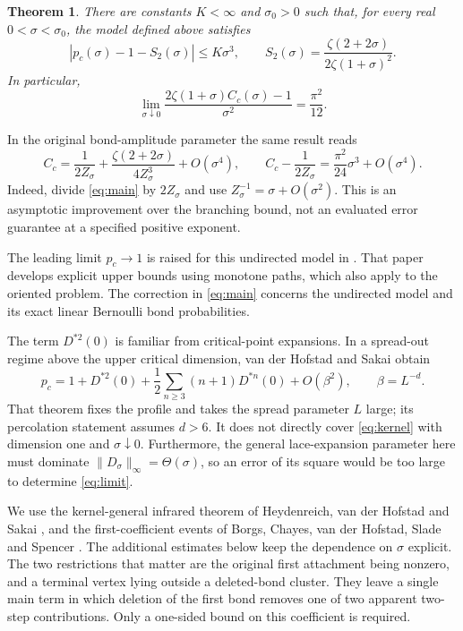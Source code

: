 \documentclass[11pt]{article}
\newtheorem{theorem}{Theorem}[section]
\theoremstyle{definition}
\begin{document}
\begin{theorem}\label{thm:main}
There are constants $K<\infty$ and $\sigma_0>0$ such that, for every real
$0<\sigma<\sigma_0$, the model defined above satisfies
\begin{equation}\label{eq:main}
 \left|p_c(\sigma)-1-S_2(\sigma)\right|\le K\sigma^3,
 \qquad
 S_2(\sigma)=\frac{\zeta(2+2\sigma)}{2\zeta(1+\sigma)^2}.
\end{equation}
In particular,
\begin{equation}\label{eq:limit}
 \lim_{\sigma\downarrow0}
 \frac{2\zeta(1+\sigma)C_c(\sigma)-1}{\sigma^2}
 =\frac{\pi^2}{12}.
\end{equation}
\end{theorem}

In the original bond-amplitude parameter the same result reads
\begin{equation}\label{eq:amplitude}
 C_c=\frac{1}{2Z_\sigma}
       +\frac{\zeta(2+2\sigma)}{4Z_\sigma^3}+O(\sigma^4),
 \qquad
 C_c-\frac{1}{2Z_\sigma}
       =\frac{\pi^2}{24}\sigma^3+O(\sigma^4).
\end{equation}
Indeed, divide \eqref{eq:main} by $2Z_\sigma$ and use
$Z_\sigma^{-1}=\sigma+O(\sigma^2)$. This is an asymptotic improvement
over the branching bound, not an evaluated error guarantee at a specified
positive exponent.

The leading limit $p_c\to1$ is raised for this undirected model in
\cite[Section~7]{Amit2026}. That paper develops explicit upper bounds using
monotone paths, which also apply to the oriented problem. The correction in
\eqref{eq:main} concerns the undirected model and its exact linear Bernoulli
bond probabilities.

The term $D^{*2}(0)$ is familiar from critical-point expansions. In a
spread-out regime above the upper critical dimension, van der Hofstad and
Sakai \cite[Theorem~1.1, (1.14)]{HS2005} obtain
\[
 p_c=1+D^{*2}(0)+\frac12\sum_{n\ge3}(n+1)D^{*n}(0)+O(\beta^2),
 \qquad \beta=L^{-d}.
\]
That theorem fixes the profile and takes the spread parameter $L$ large;
its percolation statement assumes $d>6$. It does not directly cover
\eqref{eq:kernel} with dimension one and $\sigma\downarrow0$. Furthermore,
the general lace-expansion parameter here must dominate
$\|D_\sigma\|_\infty=\Theta(\sigma)$, so an error of its square would be
too large to determine \eqref{eq:limit}.

We use the kernel-general infrared theorem of Heydenreich, van der Hofstad
and Sakai \cite{HHS2008}, and the first-coefficient events of
Borgs, Chayes, van der Hofstad, Slade and Spencer \cite{BCHSS2005}.
The additional estimates below keep the dependence on $\sigma$ explicit.
The two restrictions that matter are the original first attachment being
nonzero, and a terminal vertex lying outside a deleted-bond cluster. They
leave a single main term in which deletion of the first bond removes one
of two apparent two-step contributions. Only a one-sided bound on this
coefficient is required.
\end{document}

